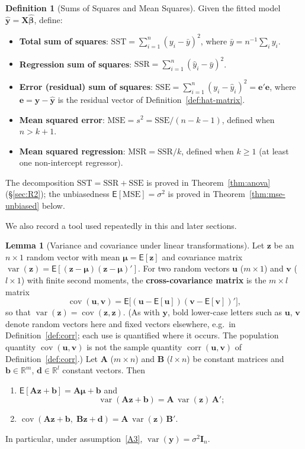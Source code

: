 \documentclass[12pt,a4paper]{article}
\theoremstyle{definition}
\newtheorem{definition}[theorem]{Definition}
\newtheorem{lemma}[theorem]{Lemma}
\newcommand\expc{\mathsf{E}}
\DeclareMathOperator\var{var}
\DeclareMathOperator\cov{cov}
\DeclareMathOperator\corr{corr}
\newcommand{\SST}{\mathrm{SST}}
\newcommand{\SSR}{\mathrm{SSR}}
\newcommand{\SSE}{\mathrm{SSE}}
\newcommand{\MSR}{\mathrm{MSR}}
\newcommand{\MSE}{\mathrm{MSE}}
\newcommand{\bX}{\mathbf{X}}
\newcommand{\by}{\mathbf{y}}
\def\bb{\boldsymbol{\beta}}
\newcommand{\bI}{\mathbf{I}}
\newcommand{\bz}{\mathbf{z}}
\newcommand{\bA}{\mathbf{A}}
\newcommand{\bv}{\mathbf{v}}
\newcommand{\Real}{\mathbb{R}}
\newcommand{\bu}{\mathbf{u}}
\begin{document}
\begin{definition}[Sums of Squares and Mean Squares]\label{def:sumsq}
Given the fitted model $\hat{\by} = \bX\hat{\bb}$, define:
\begin{itemize}
\item \textbf{Total sum of squares}: $\SST = \sum_{i=1}^n(y_i - \bar{y})^2$, where $\bar y = n^{-1}\sum_i y_i$.
\item \textbf{Regression sum of squares}: $\SSR = \sum_{i=1}^n(\hat{y}_i - \bar{y})^2$.
\item \textbf{Error (residual) sum of squares}: $\SSE = \sum_{i=1}^n(y_i - \hat{y}_i)^2 = \mathbf{e}'\mathbf{e}$, where $\mathbf{e} = \by - \hat{\by}$ is the residual vector of Definition~\ref{def:hat-matrix}.
\item \textbf{Mean squared error}: $\MSE = s^2 = \SSE/(n - k - 1)$, defined when $n > k + 1$.
\item \textbf{Mean squared regression}: $\MSR = \SSR/k$, defined when $k \geqslant 1$ (at least one non-intercept regressor).
\end{itemize}
The decomposition $\SST = \SSR + \SSE$ is proved in Theorem~\ref{thm:anova} (§\ref{sec:R2}); the unbiasedness $\expc[\MSE] = \sigma^2$ is proved in Theorem~\ref{thm:mse-unbiased} below.
\end{definition}

We also record a tool used repeatedly in this and later sections.

\begin{lemma}[Variance and covariance under linear transformations]\label{lem:var-linear}
Let $\bz$ be an $n \times 1$ random vector with mean $\boldsymbol\mu = \expc[\bz]$ and covariance matrix $\var(\bz) = \expc[(\bz - \boldsymbol\mu)(\bz - \boldsymbol\mu)']$. For two random vectors $\bu$ ($m \times 1$) and $\bv$ ($l \times 1$) with finite second moments, the \textbf{cross-covariance matrix} is the $m \times l$ matrix
\[
\cov(\bu, \bv) = \expc\bigl[(\bu - \expc[\bu])(\bv - \expc[\bv])'\bigr],
\]
so that $\var(\bz) = \cov(\bz, \bz)$. (As with $\by$, bold lower-case letters such as $\bu$, $\bv$ denote random vectors here and fixed vectors elsewhere, e.g.\ in Definition~\ref{def:corr}; each use is quantified where it occurs. The population quantity $\cov(\bu, \bv)$ is not the sample quantity $\corr(\bu, \bv)$ of Definition~\ref{def:corr}.) Let $\bA$ ($m \times n$) and $\mathbf{B}$ ($l \times n$) be constant matrices and $\mathbf{b} \in \Real^m$, $\mathbf{d} \in \Real^l$ constant vectors. Then
\begin{enumerate}[label=\textup{(\roman*)}]
\item\label{vl:i} $\expc[\bA\bz + \mathbf{b}] = \bA\boldsymbol\mu + \mathbf{b}$ and
\begin{equation}\label{eq:var-linear}
\var(\bA\bz + \mathbf{b}) = \bA\,\var(\bz)\,\bA';
\end{equation}
\item\label{vl:ii} $\cov(\bA\bz + \mathbf{b},\; \mathbf{B}\bz + \mathbf{d}) = \bA\,\var(\bz)\,\mathbf{B}'$.
\end{enumerate}
In particular, under assumption~\ref{A3}, $\var(\by) = \sigma^2\bI_n$.
\end{lemma}
\end{document}
